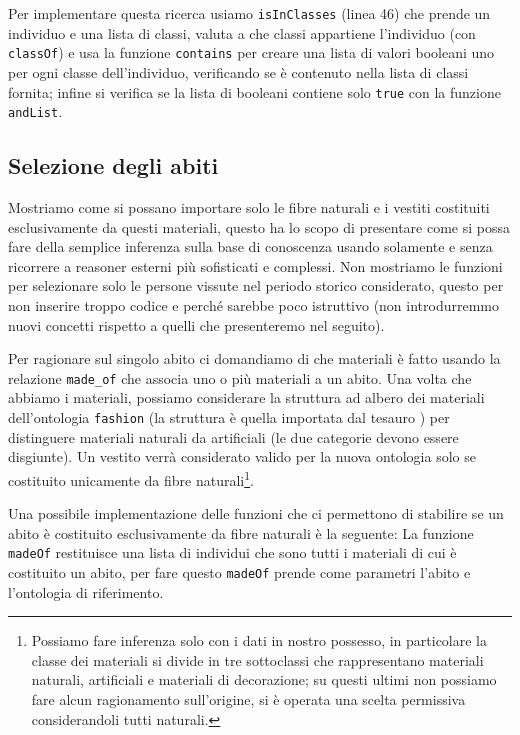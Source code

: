 Per implementare questa ricerca usiamo \verb|isInClasses| (linea 46) che prende un individuo e una lista di classi, valuta a che classi appartiene l'individuo (con \verb|classOf|) e usa la funzione \verb|contains| per creare una lista di valori booleani uno per ogni classe dell'individuo, verificando se è contenuto nella lista di classi fornita; infine si verifica se la lista di booleani contiene solo \verb|true| con la funzione \verb|andList|.

\subsection{Selezione degli abiti}
Mostriamo come si possano importare solo le fibre naturali e i vestiti costituiti esclusivamente da questi materiali, questo ha lo scopo di presentare come si possa fare della semplice inferenza sulla base di conoscenza usando solamente \cduce e senza ricorrere a reasoner esterni più sofisticati e complessi. Non mostriamo le funzioni per selezionare solo le persone vissute nel periodo storico considerato, questo per non inserire troppo codice e perché sarebbe poco istruttivo (non introdurremmo nuovi concetti rispetto a quelli che presenteremo nel seguito).

Per ragionare sul singolo abito ci domandiamo di che materiali è fatto usando la relazione \verb|made_of| che associa uno o più materiali a un abito. Una volta che abbiamo i materiali, possiamo considerare la struttura ad albero dei materiali dell'ontologia \verb|fashion| (la struttura è quella importata dal tesauro ) per distinguere materiali naturali da artificiali (le due categorie devono essere disgiunte). Un vestito verrà considerato valido per la nuova ontologia solo se costituito unicamente da fibre naturali\footnote{Possiamo fare inferenza solo con i dati in nostro possesso, in particolare la classe dei materiali si divide in tre sottoclassi che rappresentano materiali naturali, artificiali e materiali di decorazione; su questi ultimi non possiamo fare alcun ragionamento sull'origine, si è operata una scelta permissiva considerandoli tutti naturali.}.

Una possibile implementazione delle funzioni che ci permettono di stabilire se un abito è costituito esclusivamente da fibre naturali è la seguente:
La funzione \verb|madeOf| restituisce una lista di individui che sono tutti i materiali di cui è costituito un abito, per fare questo \verb|madeOf| prende come parametri l'abito e l'ontologia di riferimento. 

